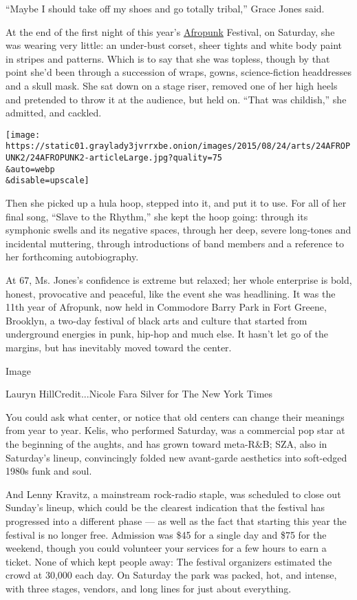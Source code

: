 ``Maybe I should take off my shoes and go totally tribal,'' Grace Jones
said.

At the end of the first night of this year's
\href{http://afropunkfest.com/}{Afropunk} Festival, on Saturday, she was
wearing very little: an under-bust corset, sheer tights and white body
paint in stripes and patterns. Which is to say that she was topless,
though by that point she'd been through a succession of wraps, gowns,
science-fiction headdresses and a skull mask. She sat down on a stage
riser, removed one of her high heels and pretended to throw it at the
audience, but held on. ``That was childish,'' she admitted, and cackled.

\texttt{[image: https://static01.graylady3jvrrxbe.onion/images/2015/08/24/arts/24AFROPUNK2/24AFROPUNK2-articleLarge.jpg?quality=75\\\&auto=webp\\\&disable=upscale]}

Then she picked up a hula hoop, stepped into it, and put it to use. For
all of her final song, ``Slave to the Rhythm,'' she kept the hoop going:
through its symphonic swells and its negative spaces, through her deep,
severe long-tones and incidental muttering, through introductions of
band members and a reference to her forthcoming autobiography.

At 67, Ms. Jones's confidence is extreme but relaxed; her whole
enterprise is bold, honest, provocative and peaceful, like the event she
was headlining. It was the 11th year of Afropunk, now held in Commodore
Barry Park in Fort Greene, Brooklyn, a two-day festival of black arts
and culture that started from underground energies in punk, hip-hop and
much else. It hasn't let go of the margins, but has inevitably moved
toward the center.

Image

Lauryn HillCredit...Nicole Fara Silver for The New York Times

You could ask what center, or notice that old centers can change their
meanings from year to year. Kelis, who performed Saturday, was a
commercial pop star at the beginning of the aughts, and has grown toward
meta-R\&B; SZA, also in Saturday's lineup, convincingly folded new
avant-garde aesthetics into soft-edged 1980s funk and soul.

And Lenny Kravitz, a mainstream rock-radio staple, was scheduled to
close out Sunday's lineup, which could be the clearest indication that
the festival has progressed into a different phase --- as well as the
fact that starting this year the festival is no longer free. Admission
was \$45 for a single day and \$75 for the weekend, though you could
volunteer your services for a few hours to earn a ticket. None of which
kept people away: The festival organizers estimated the crowd at 30,000
each day. On Saturday the park was packed, hot, and intense, with three
stages, vendors, and long lines for just about everything.

